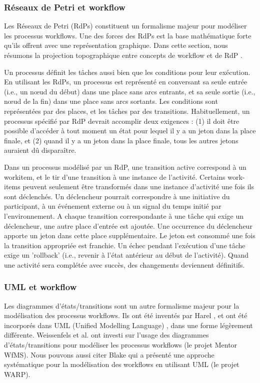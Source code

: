 \subsubsection{Réseaux de Petri et workflow
}
Les Réseaux de Petri (RdPs) \parencite{RdPs} constituent un formalisme majeur pour modéliser les processus workflows. Une des forces des RdPs est la base mathématique forte qu'ils offrent avec une représentation graphique. Dans cette section, nous résumons la projection topographique entre concepts de workflow et de RdP .%

Un processus définit les tâches aussi bien que les conditions pour leur exécution. En utilisant les RdPs, un processus est représenté en conversant sa seule entrée (i.e., un nœud du début) dans une place sans arcs entrants, et sa seule sortie (i.e., nœud de la fin) dans une place sans arcs sortants. Les conditions sont représentées par des places, et les tâches par des transitions. Habituellement, un processus spécifié par RdP devrait accomplir deux exigences : (1) il doit être possible d'accéder à tout moment un état pour lequel il y a un jeton dans la place finale, et (2) quand il y a un jeton dans la place finale, tous les autres jetons auraient dû disparaître.

Dans un processus modélisé par un RdP, une transition active correspond à un workitem, et le tir d'une transition à une instance de l'activité. Certains work-items peuvent seulement être transformés dans une instance d'activité une fois ils sont déclenchés. Un déclencheur pourrait correspondre à une initiative du participant, à un événement externe ou à un signal du temps initié par l'environnement. A chaque transition correspondante à une tâche qui exige un déclencheur, une autre place d'entrée est ajoutée. Une occurrence du déclencheur apporte un jeton dans cette place supplémentaire. Le jeton est consommé une fois la transition appropriée est franchie. Un échec pendant l'exécution d'une tâche exige un 'rollback' (i.e., revenir à l'état antérieur au début de l'activité). Quand une activité sera complétée avec succès, des changements deviennent définitifs.

\subsubsection{UML et workflow}


Les diagrammes d'états/transitions sont un autre formalisme majeur pour la modélisation des processus workflows. Ils ont été inventés par Harel \parencite{Harel}, et ont été incorporés dans UML (Unified Modelling Language)  \parencite{UML}, dans une forme légèrement différente. Weissenfels et al. \parencite{EDBT'98} ont investi sur l'usage des diagrammes d'états/transitions pour modéliser les processus workflows (le projet Mentor WfMS). Nous pouvons aussi citer Blake \parencite{WETICE'02} qui a présenté une approche systématique pour la modélisation des workflows en utilisant UML (le projet WARP). 

